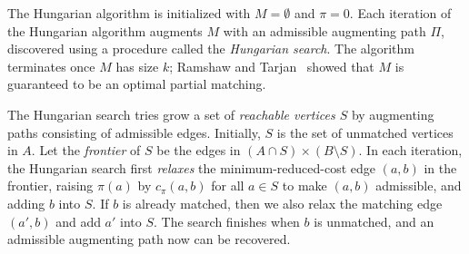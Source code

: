 \documentclass[a4paper,UKenglish]{socg-lipics-v2018}
\makeatletter
\theoremstyle{plain}
\numberwithin{figure}{section}
\def\EMPH#1{\textcolor{BrickRed}{{\emph{#1}}}}
\def\n@te#1{\textsf{\boldmath \textbf{$\langle\!\langle$#1$\rangle\!\rangle$}}\leavevmode}
\def\note#1{\textcolor{red}{\n@te{#1}}}
\renewcommand{\note}[1]{} %
\makeatother
\begin{document}
The Hungarian algorithm is initialized with $M = \emptyset$ and $\pi = 0$.
Each iteration of the Hungarian algorithm augments $M$ with an admissible
augmenting path $\Pi$, discovered using a procedure called the
\EMPH{Hungarian search}.
The algorithm terminates once $M$ has size $k$;
Ramshaw and Tarjan~\cite{RT12} showed that $M$ is guaranteed to be an optimal partial matching.

The Hungarian search tries grow a set of \EMPH{reachable vertices $S$}
by augmenting paths consisting of admissible edges.
Initially, $S$ is the set of unmatched vertices in $A$.
Let the \EMPH{frontier} of $S$ be the edges in $(A \cap S) \times (B \setminus S)$.
In each iteration, the Hungarian search first \EMPH{relaxes} the
minimum-reduced-cost edge $(a, b)$ in the frontier, raising
$\pi(a)$ by $c_\pi(a, b)$ for all $a \in S$ to make $(a, b)$
admissible, and adding $b$ into $S$.
%
If $b$ is already matched, then we also relax the matching edge $(a',b)$ and add $a'$ into $S$.
The search finishes when $b$ is unmatched, and an admissible augmenting path now can be recovered.
\end{document}
